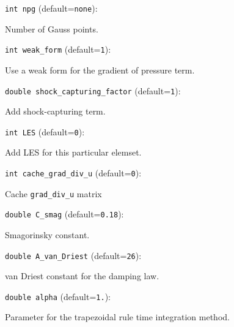 \item\verb+int npg+ {\rm(default=\verb|none|)}:

Number of Gauss points.

\item\verb+int weak_form+ {\rm(default=\verb|1|)}:

Use a weak form for the gradient of pressure term.

\item\verb+double shock_capturing_factor+ {\rm(default=\verb|1|)}:

Add shock-capturing term.

\item\verb+int LES+ {\rm(default=\verb|0|)}:

Add LES for this particular elemset.

\item\verb+int cache_grad_div_u+ {\rm(default=\verb|0|)}:

Cache \verb+grad_div_u+ matrix

\item\verb+double C_smag+ {\rm(default=\verb|0.18|)}:

Smagorinsky constant.

\item\verb+double A_van_Driest+ {\rm(default=\verb|26|)}:

van Driest constant for the damping law.

\item\verb+double alpha+ {\rm(default=\verb|1.|)}:

Parameter for the trapezoidal rule time integration method. 

